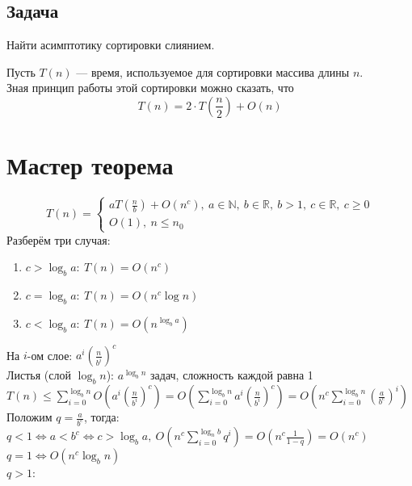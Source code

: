 \documentclass[12pt, a4paper]{article}
\begin{document}
    \subsection*{Задача}
    Найти асимптотику сортировки слиянием.\par
    Пусть $T(n)$ --- время, используемое для сортировки массива длины $n$.\\
    Зная принцип работы этой сортировки можно сказать, что
    \[T(n) = 2\cdot T\left(\frac{n}{2}\right) + O(n)\]
    \section{Мастер теорема}\label{sec:MasterTh}
    \[T(n) = \begin{cases}
        aT\left(\frac{n}{b}\right) + O(n^c),\ a\in \mathbb{N},\ b\in \mathbb{R},\ b>1,\ c\in \mathbb{R},\ c\geq 0\\
        O(1),\ n\leq n_0
    \end{cases}\]
    Разберём три случая:
    \begin{enumerate}
        \item $c > \log_b a:\ T(n) = O(n^c)$
        \item $c = \log_b a:\ T(n) = O(n^c\log n)$
        \item $c < \log_b a:\ T(n) = O(n^{\log_b a})$
    \end{enumerate}
    На $i$-ом слое: $a^i\left(\frac{n}{b^i}\right)^c$\\
    Листья (слой $\log_b n$): $a^{\log_b n}$ задач, сложность каждой равна 1\\
    $T(n) \leq \displaystyle \sum_{i = 0}^{\log_b n} O \left(a^i{\left( \frac{n}{b^i} \right)}^c\right) = O\left( \sum_{i = 0}^{\log_b n} a^i \left( \frac{n}{b^i} \right)^c \right) = O\left( n^c \sum_{i = 0}^{\log_b n} {\left( \frac{a}{b^c}  \right)}^{i} \right)$\\
    Положим $q = \frac{a}{b^c}$, тогда:\\
    $q < 1\Leftrightarrow a < b^c\Leftrightarrow c > \log_b a,\ \displaystyle O\left(n^c \sum_{i = 0}^{\log_n b} q^i\right) = O\left(n^c \frac{1}{1 - q}\right) = O\left(n^c\right)$\\
    $q = 1\Leftrightarrow O(n^c \log_b n)$\\
    $q > 1$:\\
\end{document}

